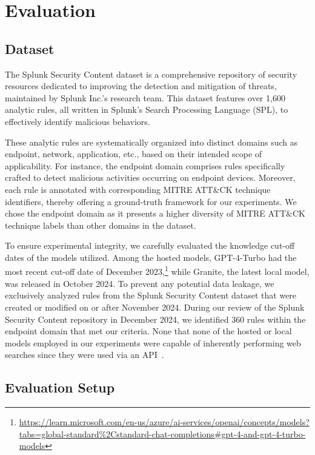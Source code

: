 \section{Evaluation}

\subsection{Dataset}


The Splunk Security Content dataset is a comprehensive repository of security resources dedicated to improving the detection and mitigation of threats, maintained by Splunk Inc.'s research team. This dataset features over 1,600 analytic rules, all written in Splunk’s Search Processing Language (SPL), to effectively identify malicious behaviors.

These analytic rules are systematically organized into distinct domains such as endpoint, network, application, etc., based on their intended scope of applicability. For instance, the endpoint domain comprises rules specifically crafted to detect malicious activities occurring on endpoint devices. Moreover, each rule is annotated with corresponding MITRE ATT\&CK technique identifiers, thereby offering a ground-truth framework for our experiments. We chose the endpoint domain as it presents a higher diversity of MITRE ATT\&CK technique labels than other domains in the dataset.

To ensure experimental integrity, we carefully evaluated the knowledge cut-off dates of the models utilized. Among the hosted models, GPT-4-Turbo had the most recent cut-off date of December 2023,\footnote{\url{https://learn.microsoft.com/en-us/azure/ai-services/openai/concepts/models?tabs=global-standard\%2Cstandard-chat-completions\#gpt-4-and-gpt-4-turbo-models}} while Granite, the latest local model, was released in October 2024. 
To prevent any potential data leakage, we exclusively analyzed rules from the Splunk Security Content dataset that were created or modified on or after November 2024. 
During our review of the Splunk Security Content repository in December 2024, we identified 360 rules within the endpoint domain that met our criteria. 
None that none of the hosted or local models employed in our experiments were capable of inherently performing web searches since they were used via an API~\cite{chen2024}. 


\subsection{Evaluation Setup}

